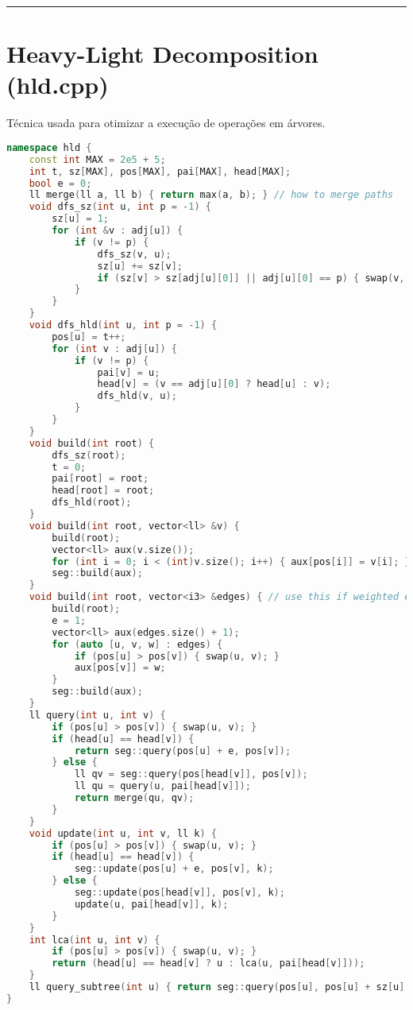 \documentclass[11pt, a4paper, twoside]{book}
\begin{document}
\hfill

\rule{\textwidth}{0.4pt}

\section{Heavy-Light Decomposition (hld.cpp)}



Técnica usada para otimizar a execução de operações em árvores.






\hfill

\begin{lstlisting}[language=C++]
namespace hld {
    const int MAX = 2e5 + 5;
    int t, sz[MAX], pos[MAX], pai[MAX], head[MAX];
    bool e = 0;
    ll merge(ll a, ll b) { return max(a, b); } // how to merge paths
    void dfs_sz(int u, int p = -1) {
        sz[u] = 1;
        for (int &v : adj[u]) {
            if (v != p) {
                dfs_sz(v, u);
                sz[u] += sz[v];
                if (sz[v] > sz[adj[u][0]] || adj[u][0] == p) { swap(v, adj[u][0]); }
            }
        }
    }
    void dfs_hld(int u, int p = -1) {
        pos[u] = t++;
        for (int v : adj[u]) {
            if (v != p) {
                pai[v] = u;
                head[v] = (v == adj[u][0] ? head[u] : v);
                dfs_hld(v, u);
            }
        }
    }
    void build(int root) {
        dfs_sz(root);
        t = 0;
        pai[root] = root;
        head[root] = root;
        dfs_hld(root);
    }
    void build(int root, vector<ll> &v) {
        build(root);
        vector<ll> aux(v.size());
        for (int i = 0; i < (int)v.size(); i++) { aux[pos[i]] = v[i]; }
        seg::build(aux);
    }
    void build(int root, vector<i3> &edges) { // use this if weighted edges
        build(root);
        e = 1;
        vector<ll> aux(edges.size() + 1);
        for (auto [u, v, w] : edges) {
            if (pos[u] > pos[v]) { swap(u, v); }
            aux[pos[v]] = w;
        }
        seg::build(aux);
    }
    ll query(int u, int v) {
        if (pos[u] > pos[v]) { swap(u, v); }
        if (head[u] == head[v]) {
            return seg::query(pos[u] + e, pos[v]);
        } else {
            ll qv = seg::query(pos[head[v]], pos[v]);
            ll qu = query(u, pai[head[v]]);
            return merge(qu, qv);
        }
    }
    void update(int u, int v, ll k) {
        if (pos[u] > pos[v]) { swap(u, v); }
        if (head[u] == head[v]) {
            seg::update(pos[u] + e, pos[v], k);
        } else {
            seg::update(pos[head[v]], pos[v], k);
            update(u, pai[head[v]], k);
        }
    }
    int lca(int u, int v) {
        if (pos[u] > pos[v]) { swap(u, v); }
        return (head[u] == head[v] ? u : lca(u, pai[head[v]]));
    }
    ll query_subtree(int u) { return seg::query(pos[u], pos[u] + sz[u] - 1); }
}
\end{lstlisting}
\end{document}
